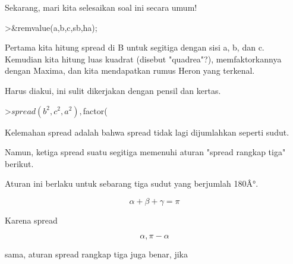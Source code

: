 \documentclass[a4paper,10pt]{article}
\begin{document}
\begin{eulernotebook}
\begin{eulercomment}
\begin{eulercomment}
\begin{eulercomment}
\begin{eulercomment}
\begin{eulercomment}
\begin{eulercomment}
\begin{eulercomment}
\begin{eulercomment}
\begin{eulercomment}
\begin{eulercomment}
\begin{eulercomment}
\begin{eulercomment}
\begin{eulercomment}
\end{eulercomment}
\begin{eulercomment}
Sekarang, mari kita selesaikan soal ini secara umum!
\end{eulercomment}
\begin{eulerprompt}
>&remvalue(a,b,c,sb,ha);
\end{eulerprompt}
\begin{eulercomment}
Pertama kita hitung spread di B untuk segitiga dengan sisi a, b, dan c. Kemudian kita hitung
luas kuadrat (disebut "quadrea"?), memfaktorkannya dengan Maxima, dan kita mendapatkan rumus
Heron yang terkenal.

Harus diakui, ini sulit dikerjakan dengan pensil dan kertas.
\end{eulercomment}
\begin{eulerprompt}
>$spread(b^2,c^2,a^2), $factor(%
\end{eulerprompt}
\begin{eulercomment}
\end{eulercomment}
\begin{eulercomment}
Kelemahan spread adalah bahwa spread tidak lagi dijumlahkan seperti sudut.

Namun, ketiga spread suatu segitiga memenuhi aturan "spread rangkap tiga" berikut.
\end{eulercomment}
\begin{eulercomment}
Aturan ini berlaku untuk sebarang tiga sudut yang berjumlah 180Â°.

\end{eulercomment}
\begin{eulerformula}
\[
\alpha+\beta+\gamma=\pi
\]
\end{eulerformula}
\begin{eulercomment}
Karena spread

\end{eulercomment}
\begin{eulerformula}
\[
\alpha, \pi-\alpha
\]
\end{eulerformula}
\begin{eulercomment}
sama, aturan spread rangkap tiga juga benar, jika


\end{eulercomment}
\end{eulercomment}
\end{eulercomment}
\end{eulercomment}
\end{eulercomment}
\end{eulercomment}
\end{eulercomment}
\end{eulercomment}
\end{eulercomment}
\end{eulercomment}
\end{eulercomment}
\end{eulercomment}
\end{eulercomment}
\end{eulernotebook}
\end{document}
